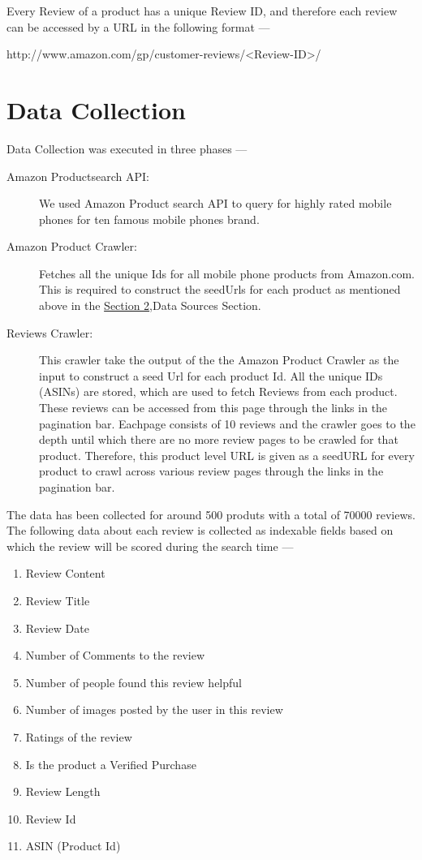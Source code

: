 \documentclass{article}
\begin{document}
Every Review of a product has a unique Review ID, and therefore each review can be accessed by a URL in the following format ---
\begin{center}
	http://www.amazon.com/gp/customer-reviews/<Review-ID>/
\end{center}

\section{Data Collection}

Data Collection was executed in three phases ---

\begin{description}
  \item[Amazon Productsearch API:] We used Amazon Product search API to query for highly rated mobile phones for ten famous mobile phones brand.
	\item[Amazon Product Crawler:] Fetches all the unique Ids for all mobile phone products from Amazon.com. This is required to construct the seedUrls for each product as mentioned above in the \hyperref[sec:dataSources]{Section 2},Data Sources Section.
	\item[Reviews Crawler:] This crawler take the output of the the Amazon Product Crawler as the input to construct a seed Url for each product Id. All the unique IDs (ASINs) are stored, which are used to fetch Reviews from each product. These reviews can be accessed from this page through the links in the pagination bar. Eachpage consists of 10 reviews and the crawler goes to the depth until which there are no more review pages to be crawled for that product. Therefore, this product level URL is given as a seedURL for every product to crawl across various review pages through the links in the pagination bar.
\end{description}

The data has been collected for around 500 produts with a total of 70000 reviews. The following data about each review is collected as indexable fields based on which the review will be scored during the search time ---

\begin{enumerate}
	\item Review Content
	\item Review Title
	\item Review Date
	\item Number of Comments to the review
	\item Number of people found this review helpful
	\item Number of images posted by the user in this review
	\item Ratings of the review 
	\item Is the product a Verified Purchase
	\item Review Length
	\item Review Id
	\item ASIN (Product Id)
\end{enumerate}
\end{document}
